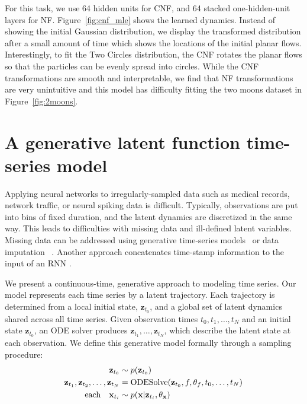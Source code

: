 \documentclass{article}
\newcommand{\vx}{\mathbf{x}}
\newcommand{\vz}{\mathbf{z}}
\newcommand{\obs}{\vx}
\newcommand{\sol}{\vz}  %
\newcommand{\solvefunc}{\textnormal{ODESolve}}
\begin{document}
For this task, we use 64 hidden units for CNF, and 64 stacked one-hidden-unit layers for NF.
Figure~\ref{fig:cnf_mle} shows the learned dynamics.
Instead of showing the initial Gaussian distribution, we display the transformed distribution after a small amount of time which shows the locations of the initial planar flows.
Interestingly, to fit the Two Circles distribution, the CNF rotates the planar flows so that the particles can be evenly spread into circles.
While the CNF transformations are smooth and interpretable, we find that NF transformations are very unintuitive and this model has difficulty fitting the two moons dataset in Figure~\ref{fig:2moons}.

\section{A generative latent function time-series model}
\label{sec:lode}

Applying neural networks to irregularly-sampled data such as medical records, network traffic, or neural spiking data is difficult.
Typically, observations are put into bins of fixed duration, and the latent dynamics are discretized in the same way.
This leads to difficulties with missing data and ill-defined latent variables. %
Missing data can be addressed using generative time-series models~\citep{alvarez2011computationally, futoma_hariharan_heller_2017, mei2017neural, soleimani2017scalable} or data imputation~ \citep{che_purushotham_cho_sontag_liu_2016}.
Another approach concatenates time-stamp information to the input of an RNN \citep{pmlr-v56-Choi16, pmlr-v56-Lipton16, du2016recurrent, li2017time}.

We present a continuous-time, generative approach to modeling time series.
Our model represents each time series by a latent trajectory.
Each trajectory is determined from a local initial state, $\sol_{t_0}$, and a global set of latent dynamics shared across all time series.
Given observation times $t_0, t_1, \dots, t_N$ and an initial state $\sol_{t_0}$, an ODE solver produces $\sol_{t_1},  \dots,\sol_{t_N}$, which describe the latent state at each observation.%
We define this generative model formally through a sampling procedure:
\begin{align}
\sol_{t_0} & \sim p(\sol_{t_0}) \\
\sol_{t_1}, \sol_{t_2}, \dots, \sol_{t_N} & = \solvefunc(\sol_{t_0}, f, \theta_f, t_0, \dots, t_N) \\
\textnormal{each} \quad \vx_{t_i} & \sim p(\obs | \sol_{t_i}, \theta_\obs)
\end{align}
\end{document}
